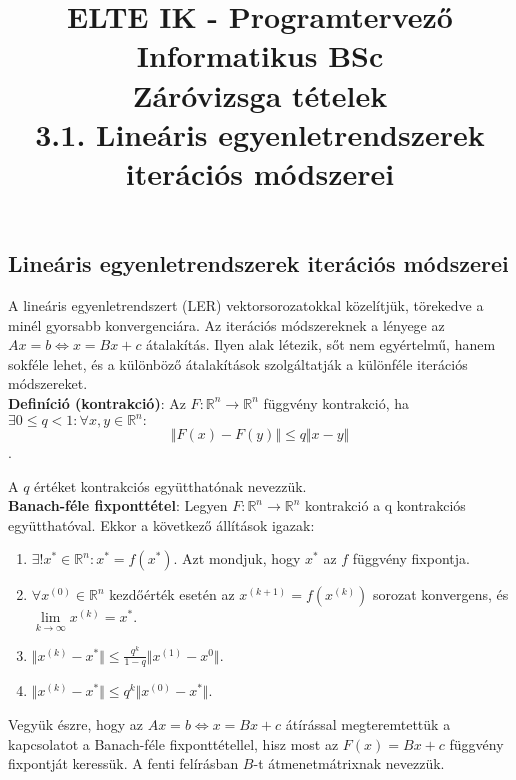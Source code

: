 \documentclass[margin=0px]{article}
\title{\textbf{{\Large ELTE IK - Programtervező Informatikus BSc} \vspace{0.2cm} \\ {\huge Záróvizsga tételek}} \vspace{0.3cm} \\ 3.1. Lineáris egyenletrendszerek iterációs módszerei}
\author{}
\date{}
\begin{document}
\maketitle

\subsection{Lineáris egyenletrendszerek iterációs módszerei}

A lineáris egyenletrendszert (LER) vektorsorozatokkal közelítjük, törekedve a minél gyorsabb konvergenciára.
Az iterációs módszereknek a lényege az $Ax = b \Longleftrightarrow x = Bx + c$ átalakítás. Ilyen alak létezik,
sőt nem egyértelmű,	hanem sokféle lehet, és a különböző átalakítások szolgáltatják a különféle iterációs módszereket.\\

\noindent \textbf{Definíció (kontrakció)}: Az $F: \mathbb{R}^{n} \to \mathbb{R}^{n}$ függvény kontrakció, ha
$\exists 0 \leq q < 1 : \forall x,y \in \mathbb{R}^{n}:$
\begin{displaymath}
    \Vert F(x) - F(y) \Vert \leq q \Vert x - y \Vert
\end{displaymath}.

\noindent A $q$ értéket kontrakciós együtthatónak nevezzük.\\

\noindent \textbf{Banach-féle fixponttétel}: Legyen $F: \mathbb{R}^{n} \to \mathbb{R}^{n}$ kontrakció a q
kontrakciós együtthatóval. Ekkor a következő állítások igazak:

\begin{enumerate}
    \item	$\exists! x^{*} \in \mathbb{R}^{n}: x^{*} = f(x^{*})$. Azt mondjuk, hogy $x^{*}$ az $f$ függvény
          fixpontja.

    \item	$\forall x^{(0)} \in \mathbb{R}^{n}$ kezdőérték esetén az $x^{(k+1)} = f(x^{(k)})$ sorozat konvergens,
          és $\lim \limits_{k\to\infty} x^{(k)} = x^{*}$.

    \item	$\Vert x^{(k)} - x^{*}\Vert \leq \frac{q^{k}}{1-q} \Vert x^{(1)} - x^{0}\Vert$.

    \item	$\Vert x^{(k)} - x^{*}\Vert \leq q^{k} \Vert x^{(0)} - x^{*}\Vert$.
\end{enumerate}

Vegyük észre, hogy az $Ax = b \Longleftrightarrow x = Bx + c$ átírással megteremtettük a kapcsolatot a
Banach-féle	fixponttétellel, hisz most az $F(x) = Bx + c$ függvény fixpontját keressük. A fenti felírásban
$B$-t átmenetmátrixnak nevezzük.\\
\end{document}
